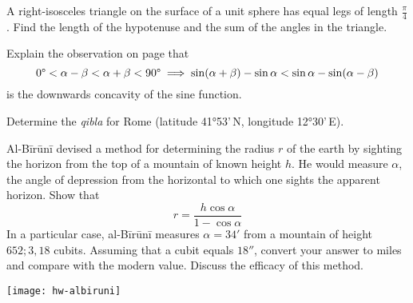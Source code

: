 \begin{exercises}{}{}
	\exstart A right-isosceles triangle on the surface of a unit sphere has equal legs of length $\frac\pi 4$. Find the length of the hypotenuse and the sum of the angles in the triangle. 
	\begin{enumerate}\setcounter{enumi}{1}
	  \item Explain the observation on page \pageref{pg:sineconcave} that
		\[
			\ang 0<\alpha-\beta<\alpha+\beta<\ang{90}\implies\sin(\alpha+\beta)-\sin\alpha<\sin\alpha-\sin(\alpha-\beta)
		\]
		is the downwards concavity of the sine function.
	
	  \item%
		Determine the \emph{qibla} for Rome (latitude \ang{41}53'\,N, longitude \ang{12}30'\,E).
	  
	  \begin{minipage}[t]{0.7\linewidth}\vspace{0pt}
		\item%
		Al-Bīrūnī devised a method for determining the radius $r$ of the earth by sighting the horizon from the top of a mountain of known height $h$. He would measure $\alpha$, the angle of depression from the horizontal to which one sights the apparent horizon. Show that
	  \[
	  	r=\frac{h\cos\alpha}{1-\cos\alpha}
	  \]
	  In a particular case, al-Bīrūnī measures $\alpha=34'$ from a mountain of height $652;3,18$ cubits. Assuming that a cubit equals $18''$, convert your answer to miles and compare with the modern value. Discuss the efficacy of this method.
	  \end{minipage}
	  \hfill
	  \begin{minipage}[t]{0.29\linewidth}\vspace{0pt}
	  	\flushright
	  	\texttt{[image: hw-albiruni]}
	  \end{minipage}
	  
	\end{enumerate}
\end{exercises}